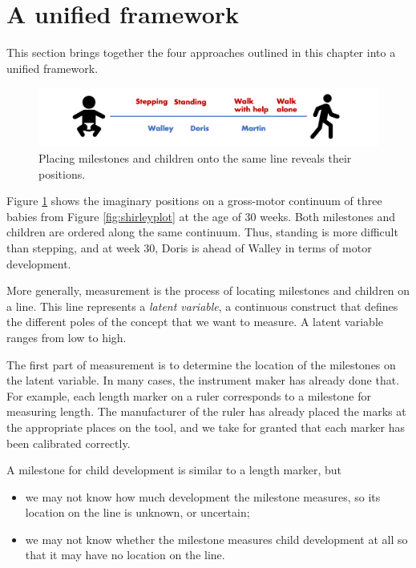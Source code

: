 \documentclass[
]{book}
\begin{document}
\hypertarget{sec:whatismeasurement}{%
\section{A unified framework}\label{sec:whatismeasurement}}

This section brings together the four approaches outlined in this chapter into a unified framework.

\begin{figure}

{\centering \includegraphics[width=1\linewidth]{fig/lineplot} 

}

\caption{Placing milestones and children onto the same line reveals their positions.}\label{fig:lineplot}
\end{figure}



Figure \ref{fig:lineplot} shows the imaginary positions on a gross-motor continuum of three babies from Figure \ref{fig:shirleyplot} at the age of 30 weeks. Both milestones and children are ordered along the same continuum. Thus, standing is more difficult than stepping, and at week 30, Doris is ahead of Walley in terms of motor development.

More generally, measurement is the process of locating milestones and children on a line. This line represents a \emph{latent variable}, a continuous construct that defines the different poles of the concept that we want to measure. A latent variable ranges from low to high.

The first part of measurement is to determine the location of the milestones on the latent variable. In many cases, the instrument maker has already done that. For example, each length marker on a ruler corresponds to a milestone for measuring length. The manufacturer of the ruler has already placed the marks at the appropriate places on the tool, and we take for granted that each marker has been calibrated correctly.

A milestone for child development is similar to a length marker, but

\begin{itemize}
\item
  we may not know how much development the milestone measures, so its location on the line is unknown, or uncertain;
\item
  we may not know whether the milestone measures child development at all so that it may have no location on the line.
\end{itemize}
\end{document}
